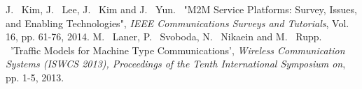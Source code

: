 \documentclass[journal]{IEEEtran}
\begin{document}
%
%
%
\begin{thebibliography}{1}

J. ~Kim, J. ~Lee, J. ~Kim and J. ~Yun. ~"M2M Service Platforms: Survey, Issues, and Enabling Technologies", \emph{IEEE Communications Surveys and Tutorials}, Vol. 16, pp. 61-76, 2014.
M. ~Laner, P. ~Svoboda, N. ~Nikaein and M. ~Rupp. ~'Traffic Models for Machine Type Communications', \emph{Wireless Communication Systems (ISWCS 2013), Proceedings of the Tenth International Symposium on}, pp. 1-5, 2013.
  
\end{thebibliography}

\end{document}
